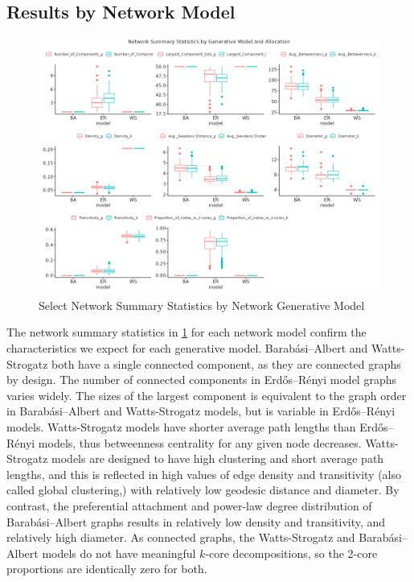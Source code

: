 \documentclass{article}
\theoremstyle{definition}
\begin{document}
\subsection{Results by Network Model}
\begin{figure}[H]
    \centering
    \includegraphics[width=\linewidth]{Corrected Figures/Network Summary Statistics.png}
    \caption{Select Network Summary Statistics by Network Generative Model}
    \label{fig:Figure B1}
\end{figure}

The network summary statistics in \ref{fig:Figure B1} for each network model confirm the characteristics we expect for each generative model. Barabási–Albert and Watts-Strogatz both have a single connected component, as they are connected graphs by design. The number of connected components in Erdős–Rényi model graphs varies widely. The sizes of the largest component is equivalent to the graph order in Barabási–Albert  and Watts-Strogatz models, but is variable in Erdős–Rényi models. Watts-Strogatz models have shorter average path lengths than Erdős–Rényi models, thus betweenness centrality for any given node decreases. Watts-Strogatz models are designed to have high clustering and short average path lengths, and this is reflected in high values of edge density and transitivity (also called global clustering,) with relatively low geodesic distance and diameter. By contrast, the preferential attachment and power-law degree distribution of Barabási–Albert graphs results in relatively low density and transitivity, and relatively high diameter. As connected graphs, the Watts-Strogatz and Barabási–Albert models do not have meaningful $k$-core decompositions, so the 2-core proportions are identically zero for both.
\end{document}
